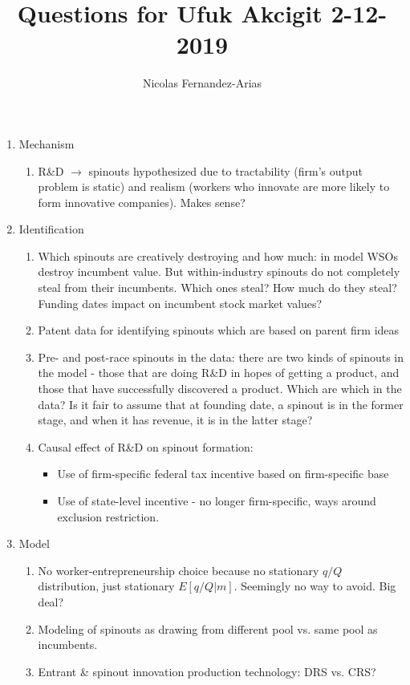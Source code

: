 \documentclass[12pt,english]{article}
\theoremstyle{remark}
\begin{document}
	
\title{Questions for Ufuk Akcigit 2-12-2019}
\author{Nicolas Fernandez-Arias}
\maketitle

\begin{enumerate}
	\item Mechanism
	\begin{enumerate}
		\item R\&D $\to$ spinouts hypothesized due to tractability (firm's output problem is static) and realism (workers who innovate are more likely to form innovative companies). Makes sense?
	\end{enumerate}
	\item Identification
	\begin{enumerate}
		\item Which spinouts are creatively destroying and how much: in model WSOs destroy incumbent value. But within-industry spinouts do not completely steal from their incumbents. Which ones steal? How much do they steal? Funding dates impact on incumbent stock market values? 
		\item Patent data for identifying spinouts which are based on parent firm ideas
		\item Pre- and post-race spinouts in the data: there are two kinds of spinouts in the model - those that are doing R\&D in hopes of getting a product, and those that have successfully discovered a product. Which are which in the data? Is it fair to assume that at founding date, a spinout is in the former stage, and when it has revenue, it is in the latter stage?
		\item Causal effect of R\&D on spinout formation:
		\begin{itemize}
			\item Use of firm-specific federal tax incentive based on firm-specific base
			\item Use of state-level incentive - no longer firm-specific, ways around exclusion restriction.
		\end{itemize} 
	\end{enumerate}
	\item Model
	\begin{enumerate}
		\item No worker-entrepreneurship choice because no stationary $q/Q$ distribution, just stationary $E[q/Q|m]$. Seemingly no way to avoid. Big deal?
		\item Modeling of spinouts as drawing from different pool vs. same pool as incumbents. 
		\item Entrant \& spinout innovation production technology: DRS vs. CRS?
	\end{enumerate}
\end{enumerate}
\end{document}
